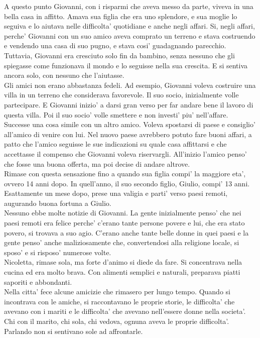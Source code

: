 A questo punto Giovanni, con i risparmi che aveva messo da parte, viveva in una bella casa in affitto. Amava sua figlia che era uno splendore, e sua moglie lo seguiva e lo aiutava nelle difficolta' quotidiane e anche negli affari. Si, negli affari, perche' Giovanni con un suo amico aveva comprato un terreno e stava costruendo e vendendo una casa di suo pugno, e stava cosi' guadagnando parecchio.\\

Tuttavia, Giovanni era cresciuto solo fin da bambino, senza nessuno che gli spiegasse come funzionava il mondo e lo seguisse nella sua crescita. E si sentiva ancora solo, con nessuno che l'aiutasse.\\
Gli amici non erano abbastanza fedeli. Ad esempio, Giovanni voleva costruire una villa in un terreno che considerava favorevole. Il suo socio, inizialmente volle partecipare. E Giovanni inizio' a darsi gran verso per far andare bene il lavoro di questa villa. Poi il suo socio' volle smettere e non investi' piu' nell'affare.\\
Successe una cosa simile con un altro amico. Voleva spostarsi di paese e consiglio' all'amico di venire con lui. Nel nuovo paese avrebbero potuto fare buoni affari, a patto che l'amico seguisse le sue indicazioni su quale casa affittarsi e che accettasse il compenso che Giovanni voleva riservargli. All'inizio l'amico penso' che fosse una buona offerta, ma poi decise di andare altrove.\\
Rimase con questa sensazione fino a quando sua figlia compi' la maggiore eta', ovvero 14 anni dopo. In quell'anno, il suo secondo figlio, Giulio, compi' 13 anni. Esattamente un mese dopo, prese una valigia e parti' verso paesi remoti, augurando buona fortuna a Giulio.\\

Nessuno ebbe molte notizie di Giovanni. La gente inizialmente penso' che nei paesi remoti era felice perche' c'erano tante persone povere e lui, che era stato povero, si trovava a suo agio. C'erano anche tante belle donne in quei paesi e la gente penso' anche maliziosamente che, convertendosi alla religione locale, si sposo' e si risposo' numerose volte.\\

Nicoletta, rimase sola, ma forte d'animo si diede da fare. Si concentrava nella cucina ed era molto brava. Con alimenti semplici e naturali, preparava piatti saporiti e abbondanti. \\
Nella citta' fece alcune amicizie che rimasero per lungo tempo. Quando si incontrava con le amiche, si raccontavano le proprie storie, le difficolta' che avevano con i mariti e le difficolta' che avevano nell'essere donne nella societa'. Chi con il marito, chi sola, chi vedova, ognuna aveva le proprie difficolta'. Parlando non si sentivano sole ad affrontarle.\\

